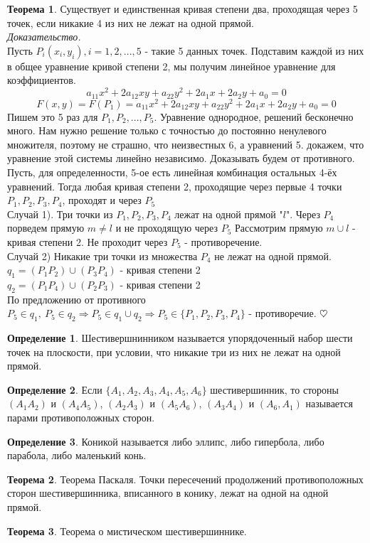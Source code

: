\documentclass{article}
\theoremstyle{definition}
\newtheorem{definition}{Определение}
\newtheorem{theorem}{Теорема}[section]
\newenvironment{ourproof}{\textit{\\ Доказательство.\\ }}{$\hfill \heartsuit$}
\begin{document}
\begin{theorem}
Существует и единственная кривая степени два, проходящая через 5 точек, если никакие 4 из них не лежат на одной прямой.
\begin{ourproof}
Пусть $P_i (x_i, y_i), i = 1,2,...,5$ - такие 5 данных точек. Подставим каждой из них в общее уравнение кривой степени 2, мы получим линейное уравнение для коэффициентов. 
$$a_{11} x^2 +2 a_{12} x y + a_{22} y^2 + 2 a_1 x + 2 a_2 y + a_0 =0$$
$$F(x, y) = F(P_1) = a_{11} x^2 +2 a_{12} x y + a_{22} y^2 + 2 a_1 x + 2 a_2 y + a_0 =0 $$
Пишем это 5 раз для $P_1, P_2, ..., P_5$. Уравнение однородное, решений бесконечно много. Нам нужно решение только с точностью до постоянно ненулевого множителя, поэтому не страшно, что неизвестных 6, а уравнений 5. 
докажем, что уравнение этой системы линейно независимо. Доказывать будем от противного. Пусть, для определенности, 5-ое есть линейная комбинация остальных 4-ёх уравнений. Тогда любая кривая степени 2, проходящие через первые 4 точки $P_1, P_2, P_3, P_4$, проходят и через $P_5$
\\ Случай 1). Три точки из $P_1, P_2, P_3, P_4$ лежат на одной прямой "$l$".  Через $P_4$ порведем прямую  $m \neq l$ и не проходящую через $P_5$
Рассмотрим прямую $m \cup l$ - кривая степени 2. Не проходит через $P_5$ - противоречение.
\\ Случай 2) Никакие три точки из множества $P_4$ не лежат на одной прямой.
\\ $q_1 = (P_1 P_2) \cup (P_3 P_4)$ - кривая степени 2
\\ $q_2 = (P_1 P_4) \cup (P_2 P_3)$ - кривая степени 2
\\ По предложению от противного $P_5 \in q_1, \ P_5 \in q_2 \Rightarrow P_5 \in q_1 \cup q_2 \Rightarrow P_5 \in \{P_1,P_2, P_3, P_4\} $ - противоречие.
\end{ourproof}
\end{theorem}
\begin{definition}
Шестивершнинником называется упорядоченный набор шести точек на плоскости, при условии, что никакие три из них не лежат на одной прямой. 
\end{definition}
\begin{definition}
Если $\{A_1, A_2, A_3, A_4, A_5, A_6 \}$ шестивершинник, то стороны $(A_1 A_2)$ и $(A_4 A_5)$, $(A_2 A_3) $ и $(A_5 A_6)$, $(A_3 A_4)$ и $(A_6, A_1)$ называется парами противоположных сторон.
\end{definition}
\begin{definition}
Коникой называется либо эллипс, либо гипербола, либо парабола, либо маленький конь.
\end{definition}

\begin{theorem}
Теорема Паскаля.
Точки пересечений продолжений противоположных сторон шестивершинника, вписанного в конику, лежат на одной на одной прямой.
\end{theorem}

\begin{theorem}
Теорема о мистическом шестивершиннике. 
\end{theorem}
\end{document}
